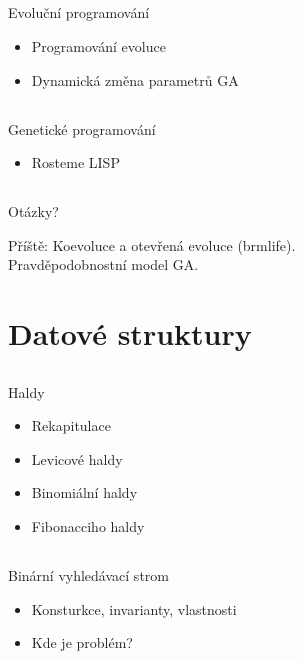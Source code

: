 \documentclass{beamer}
\begin{document}
\subsection{}
\begin{frame}{Evoluční programování}
\begin{itemize}
\item Programování evoluce
\item Dynamická změna parametrů GA
\end{itemize}
\end{frame}

\subsection{}
\begin{frame}{Genetické programování}
\begin{itemize}
\item Rosteme LISP
\end{itemize}
\end{frame}

\subsection{}
\begin{frame}{Otázky?}
\begin{center}
Příště: Koevoluce a otevřená evoluce (brmlife). \\ Pravděpodobnostní model GA.
\end{center}
\end{frame}

\section{Datové struktury}

\subsection{}
\begin{frame}{Haldy}
\begin{itemize}
\item Rekapitulace
\item Levicové haldy
\item Binomiální haldy
\item Fibonacciho haldy
\end{itemize}
\end{frame}

\subsection{}
\begin{frame}{Binární vyhledávací strom}
\begin{itemize}
\item Konsturkce, invarianty, vlastnosti
\item Kde je problém?
\end{itemize}
\end{frame}
\end{document}
